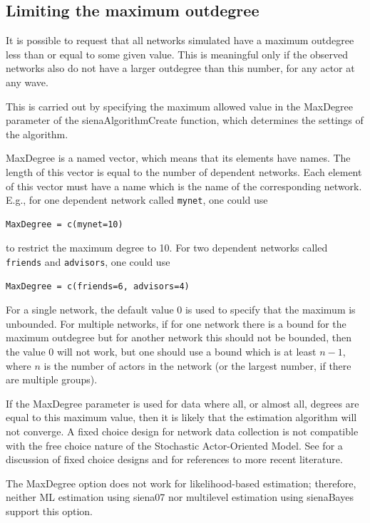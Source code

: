 \documentclass[a4paper,fleqn,11pt]{article}
\newcommand{\+}{\, + \,}
\newcommand{\saom}{{Stochastic Actor-Oriented Model}}
\begin{document}
\subsection{Limiting the maximum outdegree}
\label{S_maxdegree}

It is possible to request that all networks simulated have a
maximum outdegree less than or equal to some given value.
This is meaningful only if the observed networks also do
not have a larger outdegree than this number, for any actor at any wave.

This is carried out by specifying the maximum allowed value
in the \textsf{MaxDegree} parameter of the \textsf{sienaAlgorithmCreate}
function, which determines the settings of the algorithm.

\textsf{MaxDegree} is a named vector, which means that its elements
have names. The length of this vector
is equal to the number of dependent networks.
Each element of this vector must have a name
which is the name of the corresponding network.
E.g., for one dependent network called \texttt{mynet}, one could use
\begin{verbatim}
MaxDegree = c(mynet=10)
\end{verbatim}
to restrict the maximum degree to 10.
For two dependent networks called \texttt{friends} and \texttt{advisors},
one could use
\begin{verbatim}
MaxDegree = c(friends=6, advisors=4)
\end{verbatim}

For a single network, the default value 0 is used
to specify that the maximum is unbounded.
For multiple networks, if for one network
there is a bound for the maximum outdegree
 but for another network this should not be bounded, then
 the value 0 will not work,
 but one should use a bound which is at least $n-1$,
where $n$ is the number of actors in the network (or the largest number,
if there are multiple groups).

If the \textsf{MaxDegree} parameter is used for data where
all, or almost all, degrees are equal to this maximum value,
then it is likely that the estimation algorithm will not converge.
A fixed choice design for network data collection is not
compatible with the free choice nature of the \saom.
See \citet{HollandLeinhardt1973} for a discussion of
fixed choice designs and \citet{Znidarsic2012}
for references to more recent literature.

The \textsf{MaxDegree} option does not work for likelihood-based
estimation; therefore, neither ML estimation using \textsf{siena07}
nor multilevel estimation using \textsf{sienaBayes} support
this option.
\end{document}
